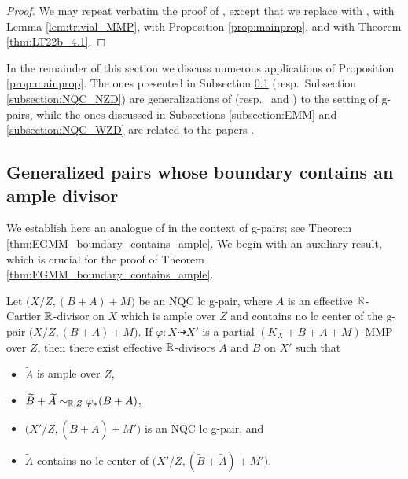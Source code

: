 	\begin{proof}
		We may repeat verbatim the proof of \cite[Theorem 1.2]{LT22b}, except that we replace \cite[Theorem A.2]{LT22b} with \cite[Theorem 1.2(1)]{LX22a}, \cite[Proposition 2.12]{LT22b} with Lemma \ref{lem:trivial_MMP}, \cite[Proposition A.3]{LT22b} with Proposition \ref{prop:mainprop}, and \cite[Theorem 4.1]{LT22b} with Theorem \ref{thm:LT22b_4.1}.
	\end{proof}
	
	In the remainder of this section we discuss numerous applications of Proposition \ref{prop:mainprop}. The ones presented in Subsection \ref{subsection:boundaries_contain_ample} (resp.\ Subsection \ref{subsection:NQC_NZD}) are generalizations of \cite[Theorem 1.5]{HH20} (resp.\ \cite[Theorem 1.1]{BH14b} and \cite[Theorem 4.5]{Hash22c}) to the setting of g-pairs, while the ones discussed in Subsections \ref{subsection:EMM} and \ref{subsection:NQC_WZD} are related to the papers \cite{LT22a,LT22b}.
	
	
	\subsection{Generalized pairs whose boundary contains an ample divisor}
	\label{subsection:boundaries_contain_ample}
	
	We establish here an analogue of \cite[Theorem 1.5]{HH20} in the context of g-pairs; see Theorem \ref{thm:EGMM_boundary_contains_ample}. We begin with an auxiliary result, which is crucial for the proof of Theorem \ref{thm:EGMM_boundary_contains_ample}.
	
	\begin{lem}\label{lem:MMP_ampleness_boundary}
		Let $\big(X/Z, (B+A)+M \big)$ be an NQC lc g-pair, where $A$ is an effective $ \mathbb{R} $-Cartier $ \mathbb{R} $-divisor on $ X $ which is ample over $Z$ and contains no lc center of the g-pair $ \big(X/Z,(B+A)+M \big)$. If $ \varphi \colon X \dasharrow X' $ is a partial $ (K_X+B+A+M) $-MMP over $Z$, then there exist effective $ \mathbb{R} $-divisors $ \widetilde A $ and $ \widetilde B $ on $ X' $ such that
		\begin{itemize}
			\item $ \widetilde A $ is ample over $ Z $,
			
			\item $ \widetilde B + \widetilde A \sim_{\mathbb{R},Z} \varphi_*(B+A)$,
			
			\item $ \big( X'/Z, (\widetilde B + \widetilde A) + M' \big) $ is an NQC lc g-pair, and
			
			\item $\widetilde A$ contains no lc center of $ \big( X'/Z, (\widetilde B + \widetilde A) +M' \big) $.
		\end{itemize}
	\end{lem}
	
